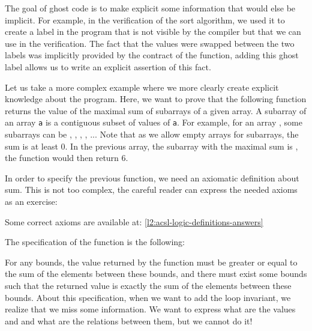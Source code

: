 The goal of ghost code is to make explicit some information that would else
be implicit. For example, in the verification of the sort algorithm, we used it
to create a label in the program that is not visible by the compiler but that
we can use in the verification. The fact that the values were swapped between the
two labels was implicitly provided by the contract of the function, adding this
ghost label allows us to write an explicit assertion of this fact.



Let us take a more complex example where we more clearly create explicit
knowledge about the program. Here, we want to prove that the
following function returns the value of the maximal sum of subarrays of
a given array. A subarray of an array \texttt{a} is a contiguous subset
of values of \texttt{a}. For example, for an array ,
some subarrays can be
\CodeInline{\{\}}, , 
, , ... Note that as we allow
empty arrays for subarrays, the sum is at least 0. In the previous
array, the subarray with the maximal sum is ,
the function would then return 6.






In order to specify the previous function, we need an axiomatic
definition about sum. This is not too complex, the careful reader
can express the needed axioms as an exercise:






Some correct axioms are available at: \ref{l2:acsl-logic-definitions-answers}



The specification of the function is the following:






For any bounds, the value returned by the function must be greater or
equal to the sum of the elements between these bounds, and there must
exist some bounds such that the returned value is exactly the sum of the
elements between these bounds. About this specification, when we want to
add the loop invariant, we realize that we miss some information.
We want to express what are the values  and  and
what are the relations between them, but we cannot do it!


